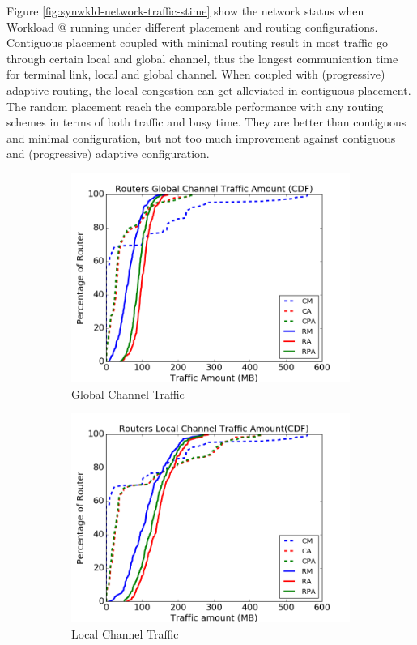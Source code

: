 \documentclass[conference,compsoc]{IEEEtran}
\makeatletter
\newcommand{\Rmnum}[1]{\expandafter\@slowromancap\romannumeral #1@}
\makeatother
\begin{document}
Figure \ref{fig:synwkld-network-traffic-stime} show the network status when Workload \Rmnum{2} running under different placement and routing configurations. Contiguous placement coupled with minimal routing result in most traffic go through certain local and global channel, thus the longest  communication time for terminal link, local and global channel. When coupled with (progressive) adaptive routing, the local congestion can get alleviated in contiguous placement. The random placement reach the comparable performance with any routing schemes in terms of both traffic and busy time. They are better than contiguous and minimal configuration, but not too much improvement against contiguous and (progressive) adaptive configuration.



\begin{figure}[t]
    \centering
    \begin{subfigure}[t]{0.32\textwidth}
        \centering
        \includegraphics[height=1.8 in]{syn-wkld/gc-traffic}
        \caption{Global Channel Traffic}
        \label{fig:synwkld-global-channel-traffic}
    \end{subfigure}\hfill
    \hspace{1em}%
    \begin{subfigure}[t]{0.32\textwidth}
        \centering
        \includegraphics[height=1.8 in]{syn-wkld/lc-traffic}
        \caption{Local Channel Traffic}
        \label{fig:synwkld-local-channel-traffic}
    \end{subfigure}\hfill
    \hspace{1em}%
    \begin{subfigure}[t]{0.32\textwidth}

\end{subfigure}
\end{figure}
\end{document}
